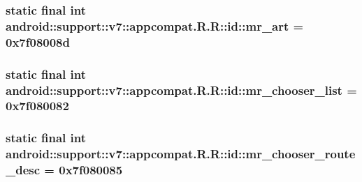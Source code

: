 \hypertarget{classandroid_1_1support_1_1v7_1_1appcompat_1_1_r_1_1id_22bc172f932c19a45501c65ed2bb0df1}{
\subsubsection[{mr\_\-art}]{\setlength{\rightskip}{0pt plus 5cm}static final int android::support::v7::appcompat.R.R::id::mr\_\-art = 0x7f08008d}}
\label{classandroid_1_1support_1_1v7_1_1appcompat_1_1_r_1_1id_22bc172f932c19a45501c65ed2bb0df1}


\hypertarget{classandroid_1_1support_1_1v7_1_1appcompat_1_1_r_1_1id_06456d467b31abb81a4db4f15b046420}{
\subsubsection[{mr\_\-chooser\_\-list}]{\setlength{\rightskip}{0pt plus 5cm}static final int android::support::v7::appcompat.R.R::id::mr\_\-chooser\_\-list = 0x7f080082}}
\label{classandroid_1_1support_1_1v7_1_1appcompat_1_1_r_1_1id_06456d467b31abb81a4db4f15b046420}


\hypertarget{classandroid_1_1support_1_1v7_1_1appcompat_1_1_r_1_1id_cbe58ee50fb4443063ea1a8fc0863745}{
\subsubsection[{mr\_\-chooser\_\-route\_\-desc}]{\setlength{\rightskip}{0pt plus 5cm}static final int android::support::v7::appcompat.R.R::id::mr\_\-chooser\_\-route\_\-desc = 0x7f080085}}
\label{classandroid_1_1support_1_1v7_1_1appcompat_1_1_r_1_1id_cbe58ee50fb4443063ea1a8fc0863745}


